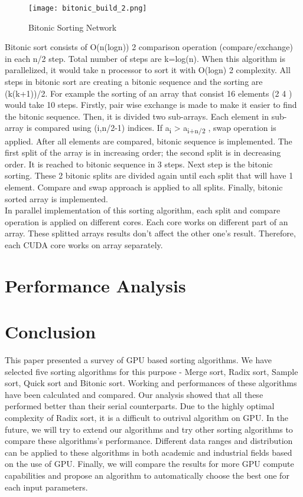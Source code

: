 \documentclass[conference]{IEEEtran}
\begin{document}
\begin{figure}[h]
\texttt{[image: bitonic\_build\_2.png]}
\caption{Bitonic Sorting Network}
\end{figure}
Bitonic sort consists of O(n(logn)) 2 comparison operation
(compare/exchange) in each n/2 step. Total number of steps
are k=log(n). When this algorithm is parallelized, it would
take n processor to sort it with O(logn) 2 complexity. All steps
in bitonic sort are creating a bitonic sequence and the sorting
are (k(k+1))/2. For example the sorting of an array that consist
16 elements (2 4 ) would take 10 steps. Firstly, pair wise exchange is made to
make it easier to find the bitonic sequence. Then, it is divided
two sub-arrays. Each element in sub-array is compared using
(i,n/2-1) indices. If a\textsubscript{i} > a\textsubscript{i+n/2} , swap operation is applied. After
all elements are compared, bitonic sequence is implemented.
The first split of the array is in increasing order; the second
split is in decreasing order. It is reached to bitonic sequence in
3 steps. Next step is the bitonic sorting. These 2 bitonic splits
are divided again until each split that will have 1 element.
Compare and swap approach is applied to all splits. Finally,
bitonic sorted array is implemented.\\

In parallel implementation of this sorting algorithm, each
split and compare operation is applied on different cores. Each
core works on different part of an array. These splitted arrays
results don't affect the other one's result. Therefore, each
CUDA core works on array separately.

\section{Performance Analysis}

\section{Conclusion}
This paper presented a survey of GPU based sorting algorithms. We have selected five sorting algorithms for this purpose - Merge sort, Radix sort, Sample sort, Quick sort and Bitonic sort. Working and performances of these algorithms have been calculated and compared. Our analysis showed that all these performed better than their serial counterparts. Due to the highly
optimal complexity of Radix sort, it is a difficult to outrival algorithm on GPU. In the future, we will try to extend our algorithms
and try other sorting algorithms to compare these algorithms’s
performance. Different data ranges and distribution can be
applied to these algorithms in both academic and industrial
fields based on the use of GPU. Finally, we will compare the results for
more GPU compute capabilities and propose an algorithm to
automatically choose the best one for each input parameters.
\end{document}
